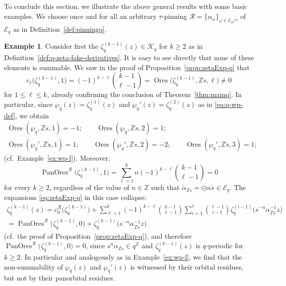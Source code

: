 \documentclass[preprint,12pt]{elsarticle}
\numberwithin{equation}{section} %
\theoremstyle{theorem}
\theoremstyle{definition}
\newtheorem{example}[theorem]{Example}
\newcommand{\bk}{\mathcal{K}} %
\newcommand{\bkq}{\bk_{q}} %
\newcommand{\ec}{\mathcal{E}} %
\newcommand{\ecq}{\ec_{q}}
\newcommand{\orbitq}{{\ecq/\tau}} %
\newcommand{\Z}{\mathbb{Z}} %
\newcommand{\zq}{\zeta_{q}}
\newcommand{\zqd}[1]{\zq^{({#1})}} %
\DeclareMathOperator{\ores}{Ores}
\DeclareMathOperator{\pano}{PanOres}
\begin{document}
To conclude this section, we illustrate the above general results with some basic examples. We choose once and for all an arbitrary $\tau$-pinning $\mathcal{R}=\{\alpha_\omega\}_{\omega\in\orbitq}$ of $\ecq$ as in Definition~\ref{def:pinningq}.

\begin{example}\label{ex:zqd-q} Consider first the $\zqd{k-1}(z)\in\bkq$ for $k\geq 2$ as in Definition~\ref{def:q-zeta-fake-derivatives}. It is easy to see directly that none of these elements is summable. We saw in the proof of Proposition~\ref{prop:zetaExp-q} that \[c_\ell\bigl(\zqd{k-1},1\bigr)=(-1)^{k-\ell}\binom{k-1}{\ell-1}=\ores\bigl(\zqd{k-1},\Z\check{s},\ell\bigr)\neq 0\] for $1\leq \ell\leq k$, already confirming the conclusion of Theorem~\ref{thm:mainq}. In particular, since $\wp_q(z)=\zqd{1}(z)$ and $\wp_q'(z)=\zqd{2}(z)$ as in \eqref{eq:q-wp-def}, we obtain \begin{gather*}\ores(\wp_q,\Z\check{s},1)=-1;\qquad \ores(\wp_q,\Z\check{s},2)=1;\\
\ores(\wp_q',\Z\check{s},1)=1;\qquad \ores(\wp_q',\Z\check{s},2)=-2;\qquad \ores(\wp_q',\Z\check{s},3)=1;\end{gather*} (cf.~Example~\ref{ex:wp-l}). Moreover, \[\pano^\mathcal{R}\bigl(\zqd{k-1},1)=\sum_{\ell= 1}^kn(-1)^{k-\ell}\binom{k-1}{\ell-1}=0\] for every $k\geq 2$, regardless of the value of $n\in\Z$ such that $\check{\alpha}_{\Z \check{s}}=\ominus n\check{s}\in\ecq$. The expansions \eqref{eq:zetaExp-q} in this case collapse:
 \begin{multline*}
    \zqd{k-1}(z)=c^\mathcal{R}_0\bigl(\zqd{k-1}\bigr)+\sum_{\ell= 1}^k(-1)^{k-\ell}\binom{k-1}{\ell-1}\sum_{i=1}^\ell\binom{\ell-1}{i-1}\zqd{i-1}\bigl(s^{-n}\alpha_{\Z\check{s}}^{-1}z\bigr)\\=\pano^\mathcal{R}\bigl(\zqd{k-1},0\bigr)+\zqd{k-1}\bigl(s^{-n}\alpha_{\Z\check{s}}^{-1}z\bigr)
\end{multline*} (cf.~the proof of Proposition~\ref{prop:zetaExp-q}), and therefore $\pano^\mathcal{R}\bigl(\zqd{k-1},0)=0$, since $s^{n}\alpha_{\Z \check{s}}\in q^\Z$ and $\zqd{k-1}(z)$ is $q$-periodic for $k\geq 2$. In particular and analogously as in Example~\ref{ex:wp-l}, we find that the non-summability of $\wp_q(z)$ and $\wp_q'(z)$ is witnessed by their orbital residues, but not by their panorbital residues.\end{example}
\end{document}
